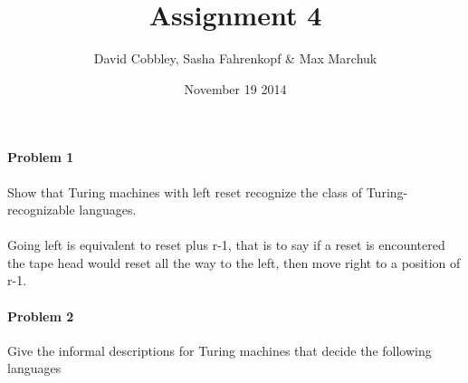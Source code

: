 ﻿\documentclass{article}
\title{Assignment 4}
\author{David Cobbley, Sasha Fahrenkopf \& Max Marchuk}
\date{November 19 2014}
\begin{document}
\maketitle


\paragraph{Problem 1} Show that Turing machines with left reset recognize
the class of Turing-recognizable languages.
\paragraph{} Going left is equivalent to reset plus r-1, that is to say if a reset is encountered the tape head would reset all the way to the left, then move right to a position of r-1.


\paragraph{Problem 2} Give the informal descriptions for Turing machines that decide the following languages
\end{document}
